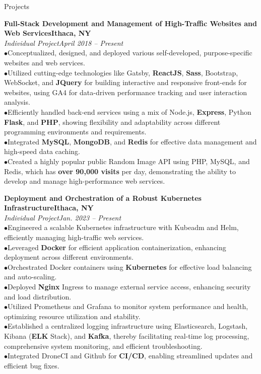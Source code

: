 \documentclass{resume} %
\begin{document}
\begin{rSection}{Projects}

{\bf Full-Stack Development and Management of High-Traffic Websites and Web Services}\hfill{\textbf{Ithaca, NY}}
\\{\em Individual Project}\hfill {\em April 2018 -- Present}
\\ $ \bullet $Conceptualized, designed, and deployed various self-developed, purpose-specific websites and web services.
\\ $ \bullet $Utilized cutting-edge technologies like Gatsby, \textbf{ReactJS}, \textbf{Sass}, Bootstrap, WebSocket, and \textbf{JQuery} for building interactive and responsive front-ends for websites, using GA4 for data-driven performance tracking and user interaction analysis.
\\ $ \bullet $Efficiently handled back-end services using a mix of Node.js, \textbf{Express}, Python \textbf{Flask}, and \textbf{PHP}, showing flexibility and adaptability across different programming environments and requirements.
\\ $ \bullet $Integrated \textbf{MySQL}, \textbf{MongoDB}, and \textbf{Redis} for effective data management and high-speed data caching.
\\ $ \bullet $Created a highly popular public Random Image API using PHP, MySQL, and Redis, which has \textbf{over 90,000 visits} per day, demonstrating the ability to develop and manage high-performance web services.

{\bf Deployment and Orchestration of a Robust Kubernetes Infrastructure}\hfill{\textbf{Ithaca, NY}}
\\{\em Individual Project}\hfill {\em Jan. 2023 -- Present}
\\ $ \bullet $Engineered a scalable Kubernetes infrastructure with Kubeadm and Helm, efficiently managing high-traffic web services.
\\ $ \bullet $Leveraged \textbf{Docker} for efficient application containerization, enhancing deployment across different environments.
\\ $ \bullet $Orchestrated Docker containers using \textbf{Kubernetes} for effective load balancing and auto-scaling.
\\ $ \bullet $Deployed \textbf{Nginx} Ingress to manage external service access, enhancing security and load distribution.
\\ $ \bullet $Utilized Prometheus and Grafana to monitor system performance and health, optimizing resource utilization and stability.
\\ $ \bullet $Established a centralized logging infrastructure using Elasticsearch, Logstash, Kibana (\textbf{ELK} Stack), and \textbf{Kafka}, thereby facilitating real-time log processing, comprehensive system monitoring, and efficient troubleshooting.
\\ $ \bullet $Integrated DroneCI and Github for \textbf{CI/CD}, enabling streamlined updates and efficient bug fixes.



\end{rSection}
\end{document}
